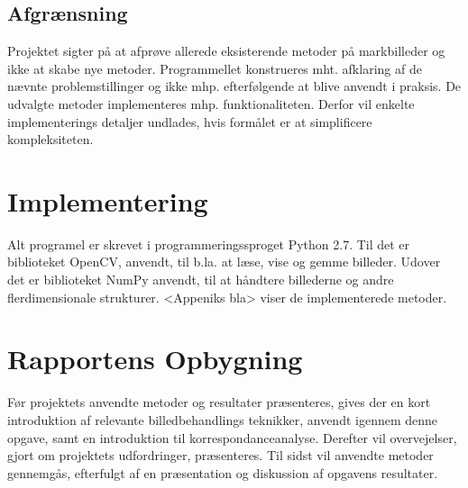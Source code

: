 \subsection{Afgrænsning} \label{subsec:afg}
Projektet sigter på at afprøve allerede eksisterende metoder på markbilleder og ikke at
skabe nye metoder. Programmellet konstrueres mht. afklaring af de nævnte problemstillinger
og ikke mhp. efterfølgende at blive anvendt i praksis. De udvalgte metoder implementeres mhp. funktionaliteten. Derfor vil enkelte implementerings detaljer undlades, hvis formålet er at simplificere kompleksiteten.
\section{Implementering}
Alt programel er skrevet i programmeringssproget Python 2.7. Til det er biblioteket OpenCV, anvendt, til b.la. at læse, vise og gemme billeder. Udover det er biblioteket NumPy anvendt, til at håndtere billederne og andre flerdimensionale strukturer. <Appeniks bla> viser de implementerede metoder.
\section{Rapportens Opbygning}
Før projektets anvendte metoder og resultater præsenteres, gives der en kort introduktion af relevante billedbehandlings teknikker, anvendt igennem denne opgave, samt en introduktion til  korrespondanceanalyse. Derefter vil overvejelser, gjort om projektets udfordringer, præsenteres. Til sidst vil anvendte metoder gennemgås, efterfulgt af en præsentation og diskussion af opgavens resultater.